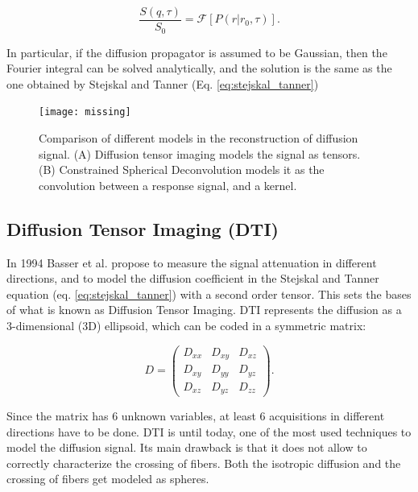 \begin{equation}
    \label{eq:fourier_callaghan}
    \frac{S(q, \tau)}{S_0} =
    \mathcal{F}[P(r|r_0, \tau)].
\end{equation}

In particular, if the diffusion propagator is assumed to be Gaussian, then the
Fourier integral can be solved analytically, and the solution is the same
as the one obtained by Stejskal and Tanner (Eq. \ref{eq:stejskal_tanner})

\begin{figure}[h]
    \texttt{[image: missing]}
    \caption{Comparison of different models in the reconstruction of diffusion
             signal. (A) Diffusion tensor imaging models the signal as tensors.
             (B) Constrained Spherical Deconvolution models it as the convolution
             between a response signal, and a kernel.}
     \label{fig:dwi_models}
\end{figure}

\subsection{Diffusion Tensor Imaging (DTI)}
\label{sec:dti}
In 1994 Basser et al. \cite{Basser1994} propose to measure the signal attenuation
in different directions, and to model the diffusion coefficient in the Stejskal and
Tanner equation (eq. \ref{eq:stejskal_tanner}) with a second order tensor. This
sets the bases of what is known as Diffusion Tensor Imaging. DTI represents the
diffusion as a 3-dimensional (3D) ellipsoid, which can be coded in a symmetric
matrix:

$$
    D =
    \begin{pmatrix}
             D_{xx} & D_{xy} & D_{xz} \\
             D_{xy} & D_{yy} & D_{yz} \\
             D_{xz} & D_{yz} & D_{zz}    
    \end{pmatrix}.
$$

Since the matrix has 6 unknown variables, at least 6 acquisitions in different
directions have to be done. DTI is until today, one
of the most used techniques to model the diffusion signal. Its main drawback
is that it does not allow to correctly characterize the crossing of fibers. Both
the isotropic diffusion and the crossing of fibers get modeled as spheres.

